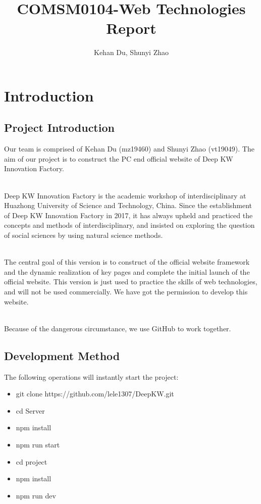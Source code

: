 \documentclass{article}
\title{COMSM0104-Web Technologies Report}
\author{Kehan Du, Shunyi Zhao}
\begin{document}
\maketitle

\section{Introduction}
\subsection{Project Introduction}
Our team is comprised of Kehan Du (mz19460) and Shunyi Zhao (vt19049). The
aim of our project is to construct the PC end official website of Deep KW
Innovation Factory.

~\\
\noindent
Deep KW Innovation Factory is the academic workshop of interdisciplinary 
at Huazhong University of Science and Technology, China. Since the establishment 
of Deep KW Innovation Factory in 2017, it has always upheld and practiced 
the concepts and methods of interdisciplinary, and insisted on exploring 
the question of social sciences by using natural science methods.

~\\
\noindent
The central goal of this version is to construct of the official website 
framework and the dynamic realization of key pages and complete the initial 
launch of the official website. This version is just used to practice the skills
of web technologies, and will not be used commercially. We have got the
permission to develop this website.

~\\
\noindent
Because of the dangerous circumstance, we use GitHub to work together.

\subsection{Development Method}
The following operations will instantly start the project:
\begin{itemize}
    \item git clone https://github.com/lele1307/DeepKW.git
    \item cd Server
    \item npm install
    \item npm run start
    \item cd project
    \item npm install
    \item npm run dev
\end{itemize}
\end{document}
